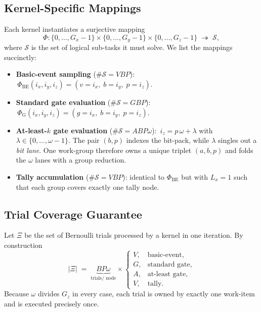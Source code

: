 \subsection{Kernel-Specific Mappings}

Each kernel instantiates a surjective mapping
\[
   \Phi : \{0,\dots,G_x-1\}\times\{0,\dots,G_y-1\}\times\{0,\dots,G_z-1\}
          \;\twoheadrightarrow\; \mathcal{S},
\]
where $\mathcal{S}$ is the set of logical sub-tasks it must solve.  We list the mappings succinctly:

\begin{itemize}
  \item \textbf{Basic-event sampling} ($\#\mathcal{S}=VBP$):
        $\,\Phi_{\mathrm{BE}}(i_x,i_y,i_z)=(v=i_x,\;b=i_y,\;p=i_z)$.

  \item \textbf{Standard gate evaluation} ($\#\mathcal{S}=GBP$):
        $\,\Phi_{\mathrm{G}}(i_x,i_y,i_z)=(g=i_x,\;b=i_y,\;p=i_z)$.

  \item \textbf{At-least-$k$ gate evaluation}
        ($\#\mathcal{S}=ABP\omega$):
        $\,i_z = p\,\omega + \lambda$ with $\lambda\in\{0,\dots,\omega-1\}$.  The pair $(b,p)$ indexes the bit-pack, while $\lambda$ singles out a \emph{bit lane}.  One work-group therefore owns a unique triplet $(a,b,p)$ and folds the $\omega$ lanes with a group reduction.

  \item \textbf{Tally accumulation} ($\#\mathcal{S}=VBP$):
        identical to $\Phi_{\mathrm{BE}}$ but with $L_x=1$ such that each group covers exactly one tally node.
\end{itemize}

\subsection{Trial Coverage Guarantee}

Let $\Xi$ be the set of Bernoulli trials processed by a kernel in one iteration.  By construction
\[
   |\Xi|
   \;=\;
   \underbrace{B P \omega}_{\text{trials/ node}}
   \times
   \begin{cases}
     V, & \text{basic-event},\\[2pt]
     G, & \text{standard gate},\\[2pt]
     A, & \text{at-least gate},\\[2pt]
     V, & \text{tally}.
   \end{cases}
\]
Because $\omega$ divides $G_z$ in every case, each trial is owned by exactly one work-item and is executed precisely once.

